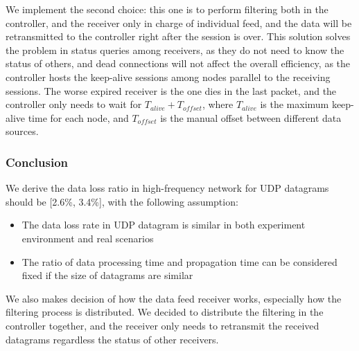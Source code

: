 \documentclass[11pt,openright,a4paper]{report}
\begin{document}
We implement the second choice: this one is to perform filtering both in the controller, and the receiver only in charge of individual feed, and the data will be retransmitted to the controller right after the session is over. This solution solves the problem in status queries among receivers, as they do not need to know the status of others, and dead connections will not affect the overall efficiency, as the controller hosts the keep-alive sessions among nodes parallel to the receiving sessions. The worse expired receiver is the one dies in the last packet, and the controller only needs to wait for $T_{alive}+T_{offset}$, where $T_{alive}$ is the maximum keep-alive time for each node, and $T_{offset}$ is the manual offset between different data sources.\\
\subsubsection{Conclusion}
We derive the data loss ratio in high-frequency network for UDP datagrams should be  [2.6\%, 3.4\%], with the following assumption:
\begin{itemize}
	\item The data loss rate in UDP datagram is similar in both experiment environment and real scenarios
	\item The ratio of data processing time and propagation time can be considered fixed if the size of datagrams are similar
\end{itemize}
We also makes decision of how the data feed receiver works, especially how the filtering process is distributed. We decided to distribute the filtering in the controller together, and the receiver only needs to retransmit the received datagrams regardless the status of other receivers.
\newpage
\end{document}

